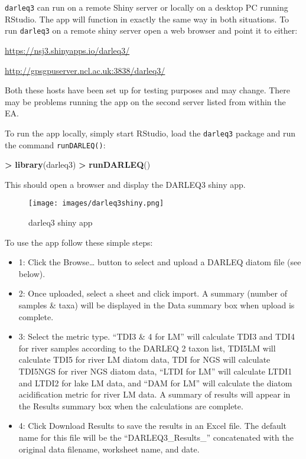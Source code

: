 \documentclass[]{article}
\newenvironment{Shaded}{\begin{snugshade}}{\end{snugshade}}
\newcommand{\KeywordTok}[1]{\textcolor[rgb]{0.13,0.29,0.53}{\textbf{#1}}}
\newcommand{\NormalTok}[1]{#1}
\newcommand{\OperatorTok}[1]{\textcolor[rgb]{0.81,0.36,0.00}{\textbf{#1}}}
\newcommand{\StringTok}[1]{\textcolor[rgb]{0.31,0.60,0.02}{#1}}
\begin{document}
\texttt{darleq3} can run on a remote Shiny server or locally on a
desktop PC running RStudio. The app will function in exactly the same
way in both situations. To run \texttt{darleq3} on a remote shiny server
open a web browser and point it to either:

\url{https://nsj3.shinyapps.io/darleq3/}

\url{http://gpsgpuserver.ncl.ac.uk:3838/darleq3/}

Both these hosts have been set up for testing purposes and may change.
There may be problems running the app on the second server listed from
within the EA.

To run the app locally, simply start RStudio, load the \texttt{darleq3}
package and run the command \texttt{runDARLEQ()}:

\begin{Shaded}
\begin{Highlighting}[]
\OperatorTok{>}\StringTok{ }\KeywordTok{library}\NormalTok{(darleq3)}
\OperatorTok{>}\StringTok{ }\KeywordTok{runDARLEQ}\NormalTok{()}
\end{Highlighting}
\end{Shaded}

This should open a browser and display the DARLEQ3 shiny app.

\begin{figure}
\centering
\texttt{[image: images/darleq3shiny.png]}
\caption{darleq3 shiny app}
\end{figure}

To use the app follow these simple steps:

\begin{itemize}
\item
  1: Click the Browse\ldots{} button to select and upload a DARLEQ
  diatom file (see below).
\item
  2: Once uploaded, select a sheet and click import. A summary (number
  of samples \& taxa) will be displayed in the Data summary box when
  upload is complete.
\item
  3: Select the metric type. ``TDI3 \& 4 for LM'' will calculate TDI3
  and TDI4 for river samples according to the DARLEQ 2 taxon list,
  TDI5LM will calculate TDI5 for river LM diatom data, TDI for NGS will
  calculate TDI5NGS for river NGS diatom data, ``LTDI for LM'' will
  calculate LTDI1 and LTDI2 for lake LM data, and ``DAM for LM'' will
  calculate the diatom acidification metric for river LM data. A summary
  of results will appear in the Results summary box when the
  calculations are complete.
\item
  4: Click Download Results to save the results in an Excel file. The
  default name for this file will be the ``DARLEQ3\_Results\_''
  concatenated with the original data filename, worksheet name, and
  date.
\end{itemize}
\end{document}
